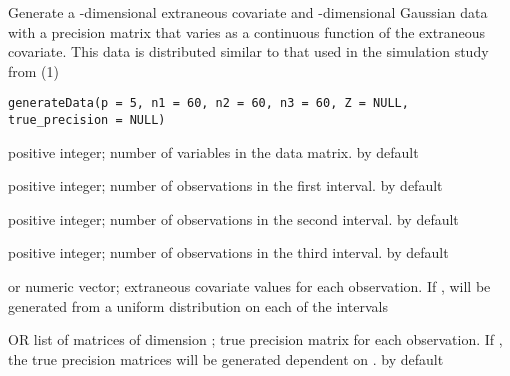 \documentclass[a4paper]{book}
\begin{document}
%
\begin{Description}\relax
Generate a -dimensional extraneous covariate
and -dimensional Gaussian data with a precision matrix that varies as
a continuous function of the extraneous covariate. This data is distributed
similar to that used in the simulation study from (1)
\end{Description}
%
\begin{Usage}
\begin{verbatim}
generateData(p = 5, n1 = 60, n2 = 60, n3 = 60, Z = NULL, true_precision = NULL)
\end{verbatim}
\end{Usage}
%
\begin{Arguments}
\begin{ldescription}
\item[\code{p}] positive integer; number of variables in the data matrix.  by
default

\item[\code{n1}] positive integer; number of observations in the first interval.
 by default

\item[\code{n2}] positive integer; number of observations in the second interval.
 by default

\item[\code{n3}] positive integer; number of observations in the third interval.
 by default

\item[\code{Z}]  or numeric vector; extraneous covariate values for each
observation. If ,  will be generated from a uniform distribution on
each of the intervals

\item[\code{true\_precision}]  OR list of matrices of dimension
; true precision matrix for each observation. If
, the true precision matrices will be generated dependent on .
 by default
\end{ldescription}
\end{Arguments}
%
\end{document}
